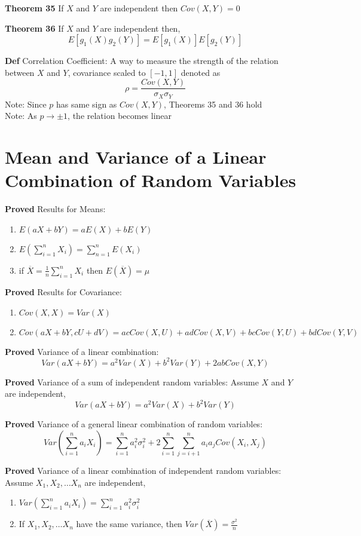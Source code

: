 \documentclass[11pt,notitlepage]{report}
\begin{document}
\textbf{Theorem 35} If $X$ and $Y$ are independent then $Cov(X, Y) = 0$

\textbf{Theorem 36} If $X$ and $Y$ are independent then,
$$E[g_1(X)g_2(Y)] = E[g_1(X)]E[g_2(Y)]$$

\textbf{Def} Correlation Coefficient: A way to measure the strength of the relation between $X$ and $Y$, covariance scaled to $[-1,1]$ denoted as
$$\rho = \frac{Cov(X, Y)}{\sigma_X\sigma_Y}$$
\hspace*{5mm} Note: Since $p$ has same sign as $Cov(X, Y)$, Theorems 35 and 36 hold\\
\hspace*{5mm} Note: As $p \to \pm 1$, the relation becomes linear


\section{Mean and Variance of a Linear Combination of Random Variables}

\textbf{Proved} Results for Means:
\begin{enumerate}
    \item $E(aX + bY) = aE(X) + bE(Y)$
    \item $\displaystyle E\left(\sum_{i=1}^n X_i\right) = \sum_{n=1}^n E(X_i)$
    \item if $\displaystyle \overline X = \frac{1}{n} \sum_{i=1}^n X_i$ then $E(\overline X) = \mu$
\end{enumerate}

\textbf{Proved} Results for Covariance:
\begin{enumerate}
    \item $Cov(X, X) = Var(X)$
    \item $Cov(aX + bY, cU+dV) = acCov(X, U) + adCov(X,V) + bcCov(Y, U) + bdCov(Y, V)$
\end{enumerate}

\textbf{Proved} Variance of a linear combination:
$$Var(aX + bY) = a^2Var(X) + b^2Var(Y) + 2abCov(X, Y)$$

\textbf{Proved} Variance of a sum of independent random variables: Assume $X$ and $Y$ are independent,
$$Var(aX + bY) = a^2Var(X) + b^2Var(Y)$$

\textbf{Proved} Variance of a general linear combination of random variables:
$$\displaystyle Var\left(\sum_{i=1}^n a_iX_i \right) = \sum_{i=1}^n a_i^2 \sigma_i^2 + 2 \sum_{i=1}^n \sum_{j=i+1}^n a_ia_j Cov(X_i, X_j)$$

\textbf{Proved} Variance of a linear combination of independent random variables: Assume $X_1, X_2, \dots X_n$ are independent,
\begin{enumerate}
    \item $\displaystyle Var\left(\sum_{i=1}^n a_iX_i \right) = \sum_{i=1}^n a_i^2 \sigma_i^2$
    \item If $X_1, X_2, \dots X_n$ have the same variance, then $Var(\overline X) = \frac{\sigma^2}{n}$
\end{enumerate}
\end{document}
